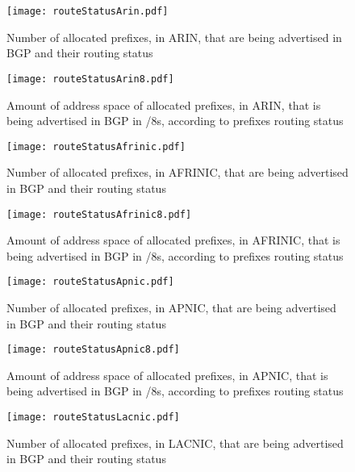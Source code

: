 \documentclass[11pt,a4paper]{scrreprt}
\begin{document}
\begin{figure}[!h]
\centering
\texttt{[image: routeStatusArin.pdf]}
\caption{Number of allocated prefixes, in ARIN, that are being advertised in BGP and their routing status}
\label{fig:routingStatusArin}
\end{figure}

\begin{figure}[!h]
\centering
\texttt{[image: routeStatusArin8.pdf]}
\caption{Amount of address space of allocated prefixes, in ARIN, that is being advertised in BGP in /8s, according to prefixes routing status}
\label{fig:routingStatusArin8}
\end{figure}

\begin{figure}[!h]
\centering
\texttt{[image: routeStatusAfrinic.pdf]}
\caption{Number of allocated prefixes, in AFRINIC, that are being advertised in BGP and their routing status}
\label{fig:routingStatusAfrinic}
\end{figure}

\begin{figure}[!h]
\centering
\texttt{[image: routeStatusAfrinic8.pdf]}
\caption{Amount of address space of allocated prefixes, in AFRINIC, that is being advertised in BGP in /8s, according to prefixes routing status}
\label{fig:routingStatusAfrinic8}
\end{figure}

\begin{figure}[!h]
\centering
\texttt{[image: routeStatusApnic.pdf]}
\caption{Number of allocated prefixes, in APNIC, that are being advertised in BGP and their routing status}
\label{fig:routingStatusApnic}
\end{figure}

\begin{figure}[!h]
\centering
\texttt{[image: routeStatusApnic8.pdf]}
\caption{Amount of address space of allocated prefixes, in APNIC, that is being advertised in BGP in /8s, according to prefixes routing status}
\label{fig:routingStatusApnic8}
\end{figure}

\begin{figure}[!h]
\centering
\texttt{[image: routeStatusLacnic.pdf]}
\caption{Number of allocated prefixes, in LACNIC, that are being advertised in BGP and their routing status}
\label{fig:routingStatusLacnic}
\end{figure}
\end{document}
